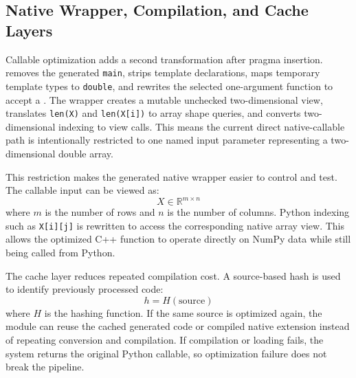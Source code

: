 \documentclass[12pt,a4paper,oneside]{report}
\begin{document}
\subsection{Native Wrapper, Compilation, and Cache Layers}

Callable optimization adds a second transformation after pragma insertion.
 removes the generated \texttt{main}, strips
template declarations, maps temporary template types to \texttt{double}, and
rewrites the selected one-argument function to accept a
. The wrapper creates a mutable unchecked
two-dimensional view, translates \texttt{len(X)} and \texttt{len(X[i])} to array
shape queries, and converts two-dimensional indexing to view calls. This means
the current direct native-callable path is intentionally restricted to one
named input parameter representing a two-dimensional double array.

This restriction makes the generated native wrapper easier to control and test.
The callable input can be viewed as:
\[
X \in \mathbb{R}^{m \times n}
\]
where \(m\) is the number of rows and \(n\) is the number of columns. Python
indexing such as \texttt{X[i][j]} is rewritten to access the corresponding
native array view. This allows the optimized C++ function to operate directly on
NumPy data while still being called from Python.

The cache layer reduces repeated compilation cost. A source-based hash is used
to identify previously processed code:
\[
h = H(\text{source})
\]
where \(H\) is the hashing function. If the same source is optimized again, the
module can reuse the cached generated code or compiled native extension instead
of repeating conversion and compilation. If compilation or loading fails, the
system returns the original Python callable, so optimization failure does not
break the pipeline.
\end{document}
